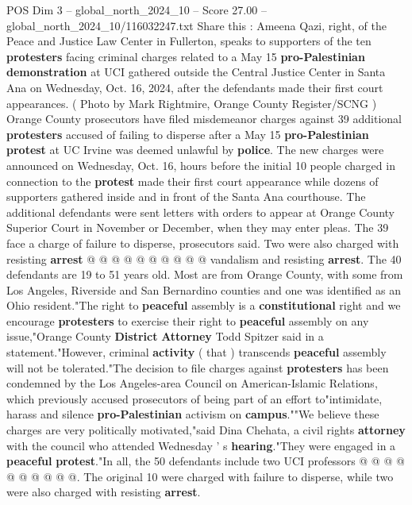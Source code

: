 \begin{textsample}{POS Dim 3 – global\_north\_2024\_10 – Score 27.00 – global\_north\_2024\_10/116032247.txt}  \label{ex:f3_pos_121}
Share this : Ameena Qazi, right, of the Peace and Justice Law Center in Fullerton, speaks to supporters of the ten \textbf{protesters} facing criminal charges related to a May 15 \textbf{pro-Palestinian} \textbf{demonstration} at UCI gathered outside the Central Justice Center in Santa Ana on Wednesday, Oct. 16, 2024, after the defendants made their first court appearances. ( Photo by Mark Rightmire, Orange County Register/SCNG ) Orange County prosecutors have filed misdemeanor charges against 39 additional \textbf{protesters} accused of failing to disperse after a May 15 \textbf{pro-Palestinian} \textbf{protest} at UC Irvine was deemed unlawful by \textbf{police}.
The new charges were announced on Wednesday, Oct. 16, hours before the initial 10 people charged in connection to the \textbf{protest} made their first court appearance while dozens of supporters gathered inside and in front of the Santa Ana courthouse.
The additional defendants were sent letters with orders to appear at Orange County Superior Court in November or December, when they may enter pleas.
The 39 face a charge of failure to disperse, prosecutors said.
Two were also charged with resisting \textbf{arrest} @ @ @ @ @ @ @ @ @ @ vandalism and resisting \textbf{arrest}.
The 40 defendants are 19 to 51 years old.
Most are from Orange County, with some from Los Angeles, Riverside and San Bernardino counties and one was identified as an Ohio resident."The right to \textbf{peaceful} assembly is a \textbf{constitutional} right and we encourage \textbf{protesters} to exercise their right to \textbf{peaceful} assembly on any issue,"Orange County \textbf{District} \textbf{Attorney} Todd Spitzer said in a statement."However, criminal \textbf{activity} ( that ) transcends \textbf{peaceful} assembly will not be tolerated."The decision to file charges against \textbf{protesters} has been condemned by the Los Angeles-area Council on American-Islamic Relations, which previously accused prosecutors of being part of an effort to"intimidate, harass and silence \textbf{pro-Palestinian} activism on \textbf{campus}.""We believe these charges are very politically motivated,"said Dina Chehata, a civil rights \textbf{attorney} with the council who attended Wednesday ' s \textbf{hearing}."They were engaged in a \textbf{peaceful} \textbf{protest}."In all, the 50 defendants include two UCI professors @ @ @ @ @ @ @ @ @ @.
The original 10 were charged with failure to disperse, while two were also charged with resisting \textbf{arrest}.

\end{textsample}
